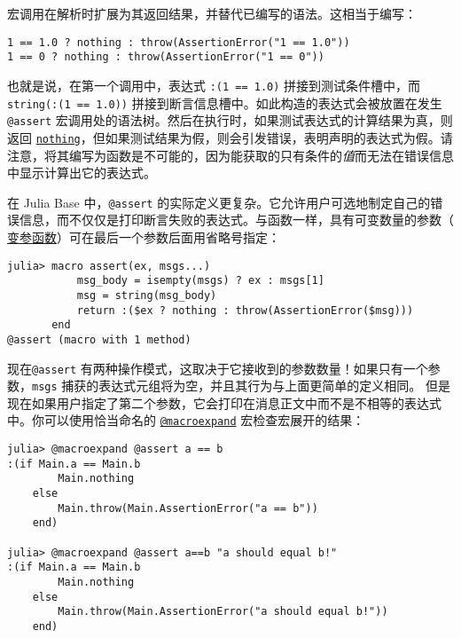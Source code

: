 宏调用在解析时扩展为其返回结果，并替代已编写的语法。这相当于编写：




\begin{verbatim}
1 == 1.0 ? nothing : throw(AssertionError("1 == 1.0"))
1 == 0 ? nothing : throw(AssertionError("1 == 0"))
\end{verbatim}



也就是说，在第一个调用中，表达式 \texttt{:(1 == 1.0)} 拼接到测试条件槽中，而 \texttt{string(:(1 == 1.0))} 拼接到断言信息槽中。如此构造的表达式会被放置在发生 \texttt{@assert} 宏调用处的语法树。然后在执行时，如果测试表达式的计算结果为真，则返回 \hyperlink{9331422207248206047}{\texttt{nothing}}，但如果测试结果为假，则会引发错误，表明声明的表达式为假。请注意，将其编写为函数是不可能的，因为能获取的只有条件的\emph{值}而无法在错误信息中显示计算出它的表达式。



在 Julia Base 中，\texttt{@assert} 的实际定义更复杂。它允许用户可选地制定自己的错误信息，而不仅仅是打印断言失败的表达式。与函数一样，具有可变数量的参数（ \hyperlink{9965084594348935329}{变参函数}）可在最后一个参数后面用省略号指定：




\begin{verbatim}
julia> macro assert(ex, msgs...)
           msg_body = isempty(msgs) ? ex : msgs[1]
           msg = string(msg_body)
           return :($ex ? nothing : throw(AssertionError($msg)))
       end
@assert (macro with 1 method)
\end{verbatim}



现在\texttt{@assert} 有两种操作模式，这取决于它接收到的参数数量！如果只有一个参数，\texttt{msgs} 捕获的表达式元组将为空，并且其行为与上面更简单的定义相同。 但是现在如果用户指定了第二个参数，它会打印在消息正文中而不是不相等的表达式中。你可以使用恰当命名的 \hyperlink{14913190777653949565}{\texttt{@macroexpand}} 宏检查宏展开的结果：




\begin{lstlisting}
julia> @macroexpand @assert a == b
:(if Main.a == Main.b
        Main.nothing
    else
        Main.throw(Main.AssertionError("a == b"))
    end)

julia> @macroexpand @assert a==b "a should equal b!"
:(if Main.a == Main.b
        Main.nothing
    else
        Main.throw(Main.AssertionError("a should equal b!"))
    end)
\end{lstlisting}



